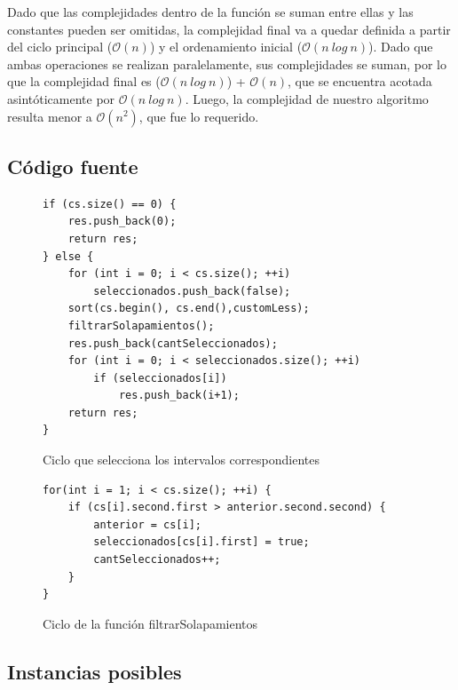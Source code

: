 Dado que las complejidades dentro de la función se suman entre ellas y las constantes pueden ser omitidas, la complejidad final va a quedar definida a partir del ciclo principal ($\mathcal{O}(n)$) y el ordenamiento inicial ($\mathcal{O}(n\ log\ n)$). Dado que ambas operaciones se realizan paralelamente, sus complejidades se suman, por lo que la complejidad final es ($\mathcal{O}(n\ log\ n)$) + $\mathcal{O}(n)$, que se encuentra acotada asintóticamente por $\mathcal{O}(n\ log\ n)$. Luego, la complejidad de nuestro algoritmo resulta menor a $\mathcal{O}(n^2)$, que fue lo requerido.

\subsection{Código fuente}

\begin{figure}[H]
\begin{center}
\begin{verbatim}
if (cs.size() == 0) {
    res.push_back(0);
    return res;
} else {
    for (int i = 0; i < cs.size(); ++i)
        seleccionados.push_back(false);
    sort(cs.begin(), cs.end(),customLess);
    filtrarSolapamientos();
    res.push_back(cantSeleccionados);
    for (int i = 0; i < seleccionados.size(); ++i)
        if (seleccionados[i])
            res.push_back(i+1);
    return res;
}
\end{verbatim}
\caption{Ciclo que selecciona los intervalos correspondientes}
\end{center}
\end{figure}

\begin{figure}[H]
\begin{center}
\begin{verbatim}
for(int i = 1; i < cs.size(); ++i) {
    if (cs[i].second.first > anterior.second.second) {
        anterior = cs[i];
        seleccionados[cs[i].first] = true;
        cantSeleccionados++;
    }
}
\end{verbatim}
\caption{Ciclo de la función filtrarSolapamientos}
\end{center}
\end{figure}

\subsection{Instancias posibles}

